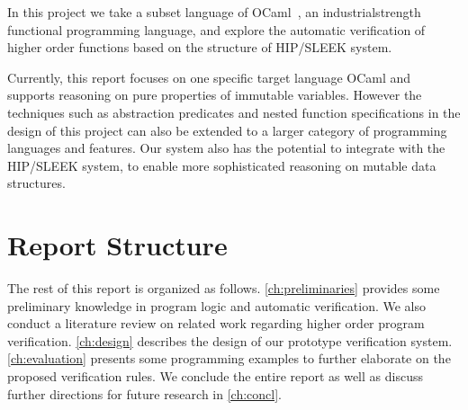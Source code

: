 In this project we take a subset language of OCaml~\cite{OCaml}, an industrial\zz{}strength functional programming language, and explore the automatic verification of higher order functions based on the structure of HIP/SLEEK system.

Currently, this report focuses on one specific target language OCaml and supports reasoning
on pure properties of immutable variables. However the techniques such as abstraction
predicates and nested function specifications in the design of this project can also be extended
to a larger category of programming languages and features. Our system also has the potential
to integrate with the HIP/SLEEK system, to enable more sophisticated reasoning on mutable
data structures.


\section{Report Structure}

The rest of this report is organized as follows. 
\autoref{ch:preliminaries} provides some preliminary knowledge in program logic and automatic verification. We also conduct a literature review on related work regarding higher order program verification. 
\autoref{ch:design} describes the design of our prototype verification system.
\autoref{ch:evaluation} presents some programming examples to further elaborate on the proposed verification rules.
We conclude the entire report as well as discuss further directions for future research in \autoref{ch:concl}.
